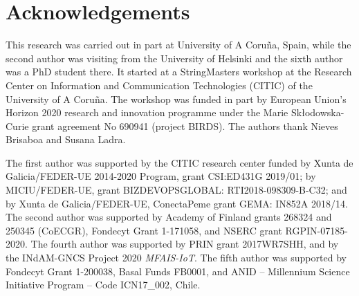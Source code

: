 \documentclass[preprint,12pt]{elsarticle}
\begin{document}
\section*{Acknowledgements}

This research was carried out in part at University of A Coru\~na, Spain, while the second author was visiting from the University of Helsinki and the sixth author was a PhD student there. It started at a StringMasters workshop at the Research Center on Information and Communication Technologies (CITIC) of the University of A Coru\~na.  The workshop was funded in part by European Union's Horizon 2020 research and innovation programme under the Marie Sk{\l}odowska-Curie grant agreement No 690941 (project BIRDS).  The authors thank Nieves Brisaboa and Susana Ladra.

The first author was supported by the CITIC research center funded by Xunta de Galicia/FEDER-UE 2014-2020 Program, grant CSI:ED431G 2019/01; by MICIU/FEDER-UE, grant BIZDEVOPSGLOBAL: RTI2018-098309-B-C32; and by Xunta de Galicia/FEDER-UE, ConectaPeme grant GEMA: IN852A 2018/14. 
The second author was supported by Academy of Finland grants 268324 and 250345 (CoECGR), Fondecyt Grant 1-171058, and NSERC grant RGPIN-07185-2020. The fourth author was supported by PRIN grant 2017WR7SHH, and by the INdAM-GNCS Project 2020 {\sl MFAIS-IoT}. The fifth author was supported by Fondecyt Grant 1-200038, Basal Funds FB0001, and ANID -- Millennium Science Initiative Program -- Code
ICN17\_002, Chile. 
\end{document}
